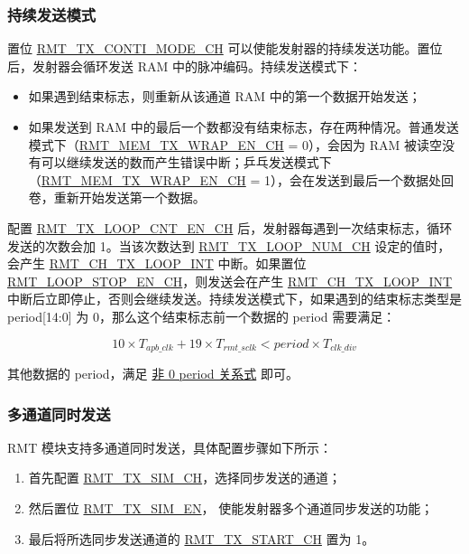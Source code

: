 \documentclass[main\_\_CN.tex]{subfiles}
\begin{document}
\subsubsection{持续发送模式}

置位 \hyperref[fielddesc:RMTTXCONTIMODECHN]{RMT\_TX\_CONTI\_MODE\_CH} 可以使能发射器的持续发送功能。置位后，发射器会循环发送 RAM 中的脉冲编码。持续发送模式下：
\begin{itemize}
    \item 如果遇到结束标志，则重新从该通道 RAM 中的第一个数据开始发送；
    \item 如果发送到 RAM 中的最后一个数都没有结束标志，存在两种情况。普通发送模式下（\hyperref[fielddesc:RMTMEMTXWRAPENCHN]{RMT\_MEM\_TX\_WRAP\_EN\_CH} = 0），会因为 RAM 被读空没有可以继续发送的数而产生错误中断；乒乓发送模式下（\hyperref[fielddesc:RMTMEMTXWRAPENCHN]{RMT\_MEM\_TX\_WRAP\_EN\_CH} = 1），会在发送到最后一个数据处回卷，重新开始发送第一个数据。
\end{itemize}

配置 \hyperref[fielddesc:RMTTXLOOPCNTENCHN]{RMT\_TX\_LOOP\_CNT\_EN\_CH} 后，发射器每遇到一次结束标志，循环发送的次数会加 1。当该次数达到 \hyperref[fielddesc:RMTTXLOOPNUMCHN]{RMT\_TX\_LOOP\_NUM\_CH} 设定的值时，会产生 \hyperref[int:RMTCHNTXLOOPINT]{RMT\_CH\_TX\_LOOP\_INT} 中断。如果置位 \hyperref[fielddesc:RMTLOOPSTOPENCHN]{RMT\_LOOP\_STOP\_EN\_CH}，则发送会在产生 \hyperref[int:RMTCHNTXLOOPINT]{RMT\_CH\_TX\_LOOP\_INT} 中断后立即停止，否则会继续发送。持续发送模式下，如果遇到的结束标志类型是 period[14:0] 为 0，那么这个结束标志前一个数据的 period 需要满足：

\begin{equation}
10 \times T_{apb\_clk} + 19 \times T_{rmt\_sclk} < period \times T_{clk\_div}
\end{equation}

其他数据的 period，满足 \hyperref[eq:rmt-period-value]{非 0 period 关系式} 即可。


\subsubsection{多通道同时发送}

RMT 模块支持多通道同时发送，具体配置步骤如下所示：
\begin{enumerate}
    \item 首先配置 \hyperref[regdesc:RMTTXSIMREG]{RMT\_TX\_SIM\_CH}，选择同步发送的通道；
    \item 然后置位 \hyperref[fielddesc:RMTTXSIMEN]{RMT\_TX\_SIM\_EN}， 使能发射器多个通道同步发送的功能；
    \item 最后将所选同步发送通道的 \hyperref[fielddesc:RMTTXSTARTCHN]{RMT\_TX\_START\_CH} 置为 1。
\end{enumerate}
\end{document}
